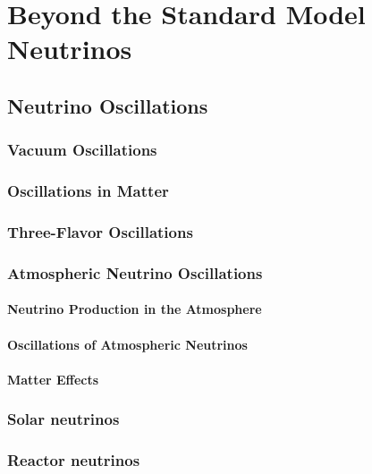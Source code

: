 \setchapterpreamble[u]{\margintoc}

\chapter{Beyond the Standard Model Neutrinos}

\section{Neutrino Oscillations}

\subsection{Vacuum Oscillations}

\subsection{Oscillations in Matter}

\subsection{Three-Flavor Oscillations}

\subsection{Atmospheric Neutrino Oscillations}

\subsubsection{Neutrino Production in the Atmosphere}

\subsubsection{Oscillations of Atmospheric Neutrinos}

\subsubsection{Matter Effects}

\subsection{Solar neutrinos}

\subsection{Reactor neutrinos}

